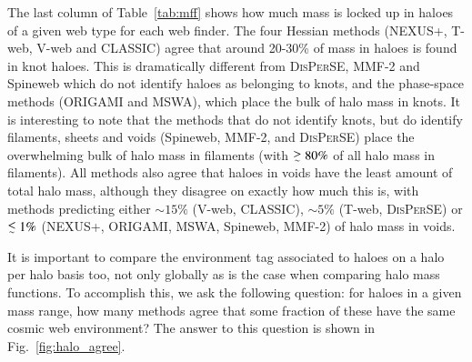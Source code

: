 \documentclass[useAMS,usenatbib]{mnras}
\def\lsim{\mathrel{\lower0.6ex\hbox{$\buildrel {\textstyle <}
 \over {\scriptstyle \sim}$}}}
\def\gsim{\mathrel{\lower0.6ex\hbox{$\buildrel {\textstyle >}
 \over {\scriptstyle \sim}$}}}
\newcommand{\mcd}[1]{\textcolor{red}{\sout{  #1}}}
\newcommand{\classic}{\textsc{CLASSIC}}
\newcommand{\disperse}{\textsc{DisPerSE}}
\newcommand{\origami}{\textsc{ORIGAMI}}
\newcommand{\nexus}{\textsc{NEXUS+}}
\newcommand{\tweb}{T-web}
\newcommand{\vweb}{V-web}
\newcommand{\mswa}{\textsc{MSWA}}
\newcommand{\mmft}{\textsc{MMF-2}}
\newcommand{\spine}{Spineweb}
\begin{document}
%
%

The last column of Table~\ref{tab:mff} shows how much mass is locked up in haloes of a given web type for each web finder. The four Hessian methods (\nexus{}, \tweb{}, \vweb{} and \classic{}) agree that around 20-30\% of mass in haloes is found in knot haloes. This is dramatically different from \disperse{}, \mmft{} and \spine{} which do not identify haloes as belonging to knots, and the phase-space methods (\origami{} and \mswa{}), which place the bulk of halo mass in knots. It is interesting to note that the methods that do not identify knots, but do identify filaments, sheets and voids (\spine{}, \mmft{}, and \disperse{}) place the overwhelming bulk of halo mass in filaments (with $\gsim 80\%$ of all halo mass in filaments). All methods also agree that haloes in voids have the least amount of total halo mass, although they disagree on exactly how much this is, with methods predicting either $\sim 15\%$  (\vweb{}, \classic{}), $\sim 5\%$ (\tweb{}, \disperse{}) or $\lsim 1\%$ (\nexus{}, \origami{}, \mswa{}, \spine, \mmft) of halo mass in voids.


It is important to compare the environment tag associated to haloes on a halo per halo basis too, not only globally as is the case when comparing halo mass functions. To accomplish this, we ask the following question: for haloes in a given mass range, how many methods agree that some fraction of these have the same cosmic web environment? The answer to this question is shown in Fig.~\ref{fig:halo_agree}.
\end{document}
